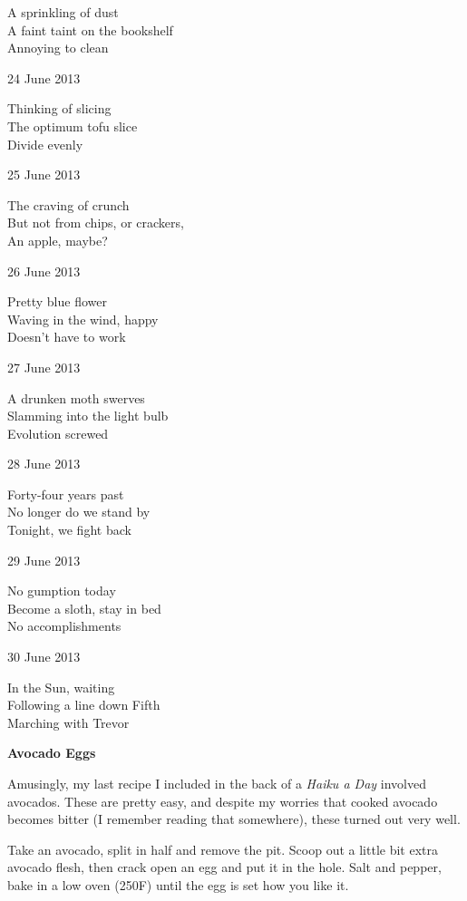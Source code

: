 \documentclass[12pt]{article}
\begin{document}
A sprinkling of dust \\
A faint taint on the bookshelf \\
Annoying to clean


\newpage

24 June 2013

Thinking of slicing \\
The optimum tofu slice \\
Divide evenly

25 June 2013

The craving of crunch \\
But not from chips, or crackers, \\
An apple, maybe?

26 June 2013

Pretty blue flower \\
Waving in the wind, happy \\
Doesn't have to work

27 June 2013

A drunken moth swerves \\
Slamming into the light bulb \\
Evolution screwed

28 June 2013

Forty-four years past \\
No longer do we stand by \\
Tonight, we fight back

29 June 2013

No gumption today \\
Become a sloth, stay in bed \\
No accomplishments

30 June 2013

In the Sun, waiting \\
Following a line down Fifth \\
Marching with Trevor

\newpage

\begin{center}
{\bfseries Avocado Eggs }
\end{center}

Amusingly, my last recipe I included in the back of a {\em Haiku a Day} involved 
avocados. These are pretty easy, and despite my worries that cooked avocado becomes
bitter (I remember reading that somewhere), these turned out very well.

Take an avocado, split in half and remove the pit. Scoop out a little bit extra avocado flesh,
then crack open an egg and put it in the hole. Salt and pepper, bake in a low oven (250F)
until the egg is set how you like it.
\end{document}
